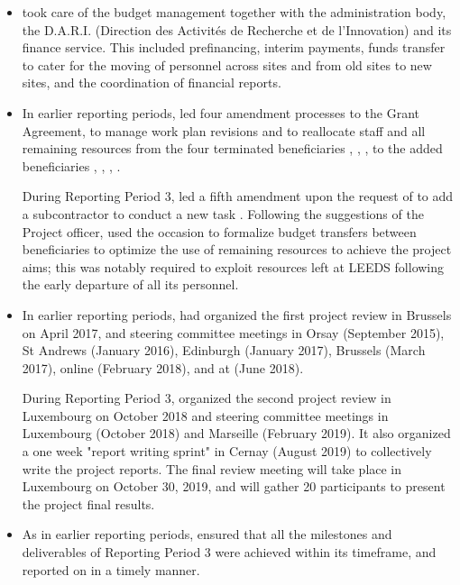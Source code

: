 \begin{itemize}
\item {} took care of the budget management together with the
  administration body, the D.A.R.I. (Direction des Activités de
  Recherche et de l'Innovation) and its finance service. This included
  prefinancing, interim payments, funds transfer to cater for the moving of personnel
  across sites and from old sites to new sites, and the coordination
  of financial reports.
\item In earlier reporting periods,  led four amendment
  processes to the Grant Agreement, to manage work plan revisions and
  to reallocate staff and all remaining resources from the four
  terminated beneficiaries , , ,
   to the added beneficiaries , ,
  , .

  \noindent
  During Reporting Period 3,  led a fifth amendment upon
  the request of  to add a subcontractor to conduct a new
  task . Following the suggestions of
  the Project officer,  used the occasion to formalize budget
  transfers between beneficiaries to optimize the use of remaining
  resources to achieve the project aims; this was notably required to
  exploit resources left at LEEDS following the early departure of all
  its personnel.

\item In earlier reporting periods,  had organized the first
  project review in Brussels on April 2017, and steering committee
  meetings in Orsay (September 2015), St Andrews (January 2016),
  Edinburgh (January 2017), Brussels (March 2017), online (February
  2018), and at  (June 2018).

  \noindent
  During Reporting Period 3,  organized the second project
  review in Luxembourg on October 2018 and steering committee meetings
  in Luxembourg (October 2018) and Marseille (February 2019). It also
  organized a one week "report writing sprint" in Cernay (August 2019)
  to collectively write the project reports. The final review meeting
  will take place in Luxembourg on October 30, 2019, and will gather
  20 \ODK participants to present the project final results.

\item As in earlier reporting periods,  ensured that all the
  milestones and deliverables of Reporting Period 3 were achieved
  within its timeframe, and reported on in a timely manner.


\end{itemize}

